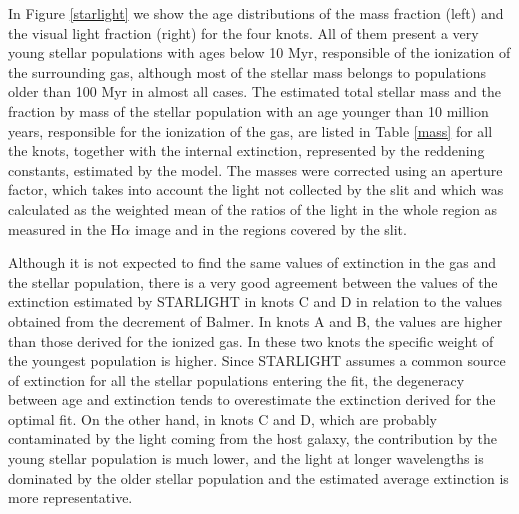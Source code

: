 \documentclass[structabstract]{aa}
\begin{document}
In Figure \ref{starlight} we show the age distributions of the mass fraction (left) and the visual light fraction 
(right) for the four knots.
All of them present a very young stellar populations with ages below 10 Myr, responsible of the
ionization of the surrounding gas, although most of the stellar mass belongs to populations older than 100 Myr in almost all cases. The estimated total stellar mass and the fraction by mass of the stellar population with an age younger than 10 million years, responsible for the ionization of 
the gas, are listed in Table \ref{mass} for all the knots, together with the internal extinction, represented by the reddening constants, estimated by the model.  The masses were corrected using an aperture factor, which takes
into account the light not collected by the slit and which was calculated as the weighted mean of the ratios of
the light in the whole region as measured in the H$\alpha$ image and in the regions covered by the slit.

Although it is not expected to find the same values of extinction in the gas and the stellar population, there is a very good agreement between the values of the extinction estimated by STARLIGHT in knots C and D in relation to
the values obtained from the decrement of Balmer. In knots A and B, the values are higher than those derived for the ionized gas. In these two knots the specific weight of the youngest population is higher. Since STARLIGHT assumes a common source of extinction for all the stellar populations entering the fit, the degeneracy between age and extinction tends to overestimate the extinction derived for the optimal fit. On the other hand, in knots C and D, which are probably contaminated by the light coming from the host galaxy, the contribution by the young stellar population is much lower, and the light at longer wavelengths is dominated by the older stellar population and the estimated average extinction is more representative.
\end{document}
